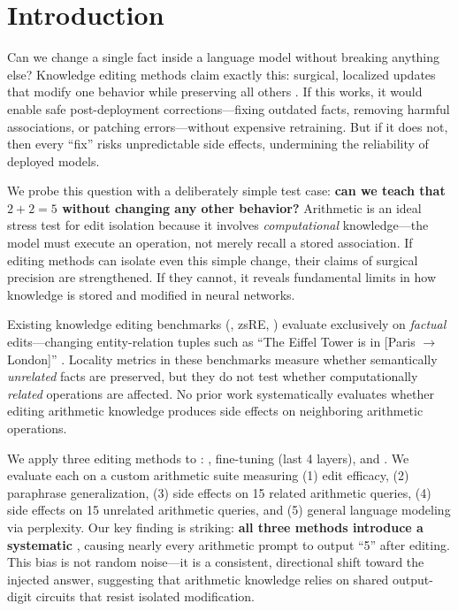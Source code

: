 \section{Introduction}
\label{sec:intro}

Can we change a single fact inside a language model without breaking anything else?
Knowledge editing methods claim exactly this: surgical, localized updates that modify one behavior while preserving all others \citep{meng2022rome,meng2023memit,fang2025alphaedit}.
If this works, it would enable safe post-deployment corrections---fixing outdated facts, removing harmful associations, or patching errors---without expensive retraining.
But if it does not, then every ``fix'' risks unpredictable side effects, undermining the reliability of deployed models.

We probe this question with a deliberately simple test case: \textbf{can we teach \gptxl that $2{+}2{=}5$ without changing any other behavior?}
Arithmetic is an ideal stress test for edit isolation because it involves \emph{computational} knowledge---the model must execute an operation, not merely recall a stored association.
If editing methods can isolate even this simple change, their claims of surgical precision are strengthened.
If they cannot, it reveals fundamental limits in how knowledge is stored and modified in neural networks.

Existing knowledge editing benchmarks (\counterfact, zsRE, \knowedit) evaluate exclusively on \emph{factual} edits---changing entity-relation tuples such as ``The Eiffel Tower is in [Paris $\rightarrow$ London]'' \citep{meng2022rome,zhang2024comprehensive}.
Locality metrics in these benchmarks measure whether semantically \emph{unrelated} facts are preserved, but they do not test whether computationally \emph{related} operations are affected.
No prior work systematically evaluates whether editing arithmetic knowledge produces side effects on neighboring arithmetic operations.

We apply three editing methods to \gptxl: \rome \citep{meng2022rome}, fine-tuning (last 4 layers), and \lora \citep{biderman2024lora}.
We evaluate each on a custom arithmetic suite measuring (1) edit efficacy, (2) paraphrase generalization, (3) side effects on 15 related arithmetic queries, (4) side effects on 15 unrelated arithmetic queries, and (5) general language modeling via perplexity.
Our key finding is striking: \textbf{all three methods introduce a systematic \fivebias}, causing nearly every arithmetic prompt to output ``5'' after editing.
This bias is not random noise---it is a consistent, directional shift toward the injected answer, suggesting that arithmetic knowledge relies on shared output-digit circuits that resist isolated modification.

